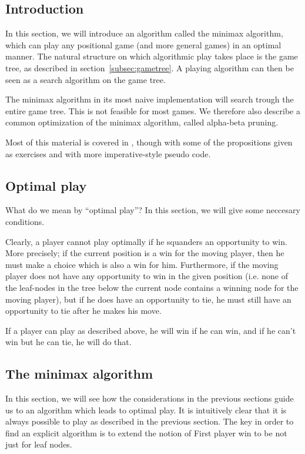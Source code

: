 \subsection{Introduction}

In this section, we will introduce an algorithm called the minimax algorithm, which can play any positional game (and more general games) in an optimal manner.
The natural structure on which algorithmic play takes place is the game tree, as described in section~\ref{subsec:gametree}.
A playing algorithm can then be seen as a search algorithm on the game tree.

The minimax algorithm in its most naive implementation will search trough the entire game tree. This is not feasible for most games.
We therefore also describe a common optimization of the minimax algorithm, called alpha-beta pruning.


Most of this material is covered in \citep{aimodernapproach}, though with some of the propositions given as exercises and with more imperative-style pseudo code.

\subsection{Optimal play}
\label{subsec:optimal_play}

What do we mean by ``optimal play''?
In this section, we will give some neccesary conditions.

Clearly, a player cannot play optimally if he squanders an opportunity to win.
More precisely; if the current position is a win for the moving player, then he must make a choice which is also a win for him.
Furthermore, if the moving player does not have any opportunity to win in the given position (i.e. none of the leaf-nodes in the tree below the current node contains a winning node for the moving player), but if he does have an opportunity to tie, he must still have an opportunity to tie after he makes his move.

If a player can play as described above, he will win if he can win, and if he can't win but he can tie, he will do that.

\subsection{The minimax algorithm}
\label{sec:minimax}

In this section, we will see how the considerations in the previous sections guide us to an algorithm which leads to optimal play.
It is intuitively clear that it is always possible to play as described in the previous section.
The key in order to find an explicit algorithm is to extend the notion of First player win to be not just for leaf nodes.

